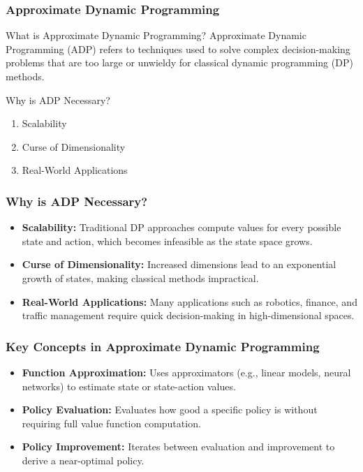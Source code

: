 \documentclass[aspectratio=169]{beamer}
\begin{document}
\begin{frame}[fragile]
    \frametitle{Approximate Dynamic Programming}
    \begin{block}{What is Approximate Dynamic Programming?}
        Approximate Dynamic Programming (ADP) refers to techniques used to solve complex decision-making problems that are too large or unwieldy for classical dynamic programming (DP) methods.
    \end{block}
    \begin{block}{Why is ADP Necessary?}
        \begin{enumerate}
            \item Scalability
            \item Curse of Dimensionality
            \item Real-World Applications
        \end{enumerate}
    \end{block}
\end{frame}

\begin{frame}[fragile]
    \frametitle{Why is ADP Necessary?}
    \begin{itemize}
        \item \textbf{Scalability:} Traditional DP approaches compute values for every possible state and action, which becomes infeasible as the state space grows.
        \item \textbf{Curse of Dimensionality:} Increased dimensions lead to an exponential growth of states, making classical methods impractical.
        \item \textbf{Real-World Applications:} Many applications such as robotics, finance, and traffic management require quick decision-making in high-dimensional spaces.
    \end{itemize}
\end{frame}

\begin{frame}[fragile]
    \frametitle{Key Concepts in Approximate Dynamic Programming}
    \begin{itemize}
        \item \textbf{Function Approximation:} Uses approximators (e.g., linear models, neural networks) to estimate state or state-action values.
        \item \textbf{Policy Evaluation:} Evaluates how good a specific policy is without requiring full value function computation.
        \item \textbf{Policy Improvement:} Iterates between evaluation and improvement to derive a near-optimal policy.
    \end{itemize}
\end{frame}
\end{document}
